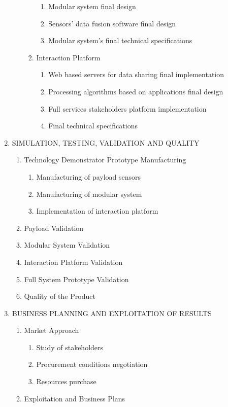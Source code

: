 \begin{enumerate}[label*=\arabic*.]
\begin{enumerate}[label*=\arabic*.]
\begin{enumerate}[label*=\arabic*.]
			\begin{enumerate}[label*=\arabic*.]
				\item Modular system final design
				\item Sensors' data fusion software final design
				\item Modular system's final technical specifications
			\end{enumerate}
			\item Interaction Platform
			\begin{enumerate}[label*=\arabic*.]
				\item Web based servers for data sharing final implementation
				\item Processing algorithms based on applications final design
				\item Full services stakeholders platform implementation
				\item Final technical specifications
			\end{enumerate}
		\end{enumerate}
	\end{enumerate}
	
	\item SIMULATION, TESTING, VALIDATION AND QUALITY
	
	\begin{enumerate}[label*=\arabic*.]
		\item Technology Demonstrator Prototype Manufacturing
		\begin{enumerate}[label*=\arabic*.]
			\item Manufacturing of payload sensors
			\item Manufacturing of modular system
			\item Implementation of interaction platform
		\end{enumerate}
		\item Payload Validation
		\item Modular System Validation
		\item Interaction Platform Validation
		\item Full System Prototype Validation
		\item Quality of the Product
	\end{enumerate}
	
	\item BUSINESS PLANNING AND EXPLOITATION OF RESULTS
	
	\begin{enumerate}[label*=\arabic*.]
		\item Market Approach
		\begin{enumerate}[label*=\arabic*.]
			\item Study of stakeholders
			\item Procurement conditions negotiation
			\item Resources purchase	
		\end{enumerate}
		\item Exploitation and Business Plans
	\end{enumerate}
	

\end{enumerate}
